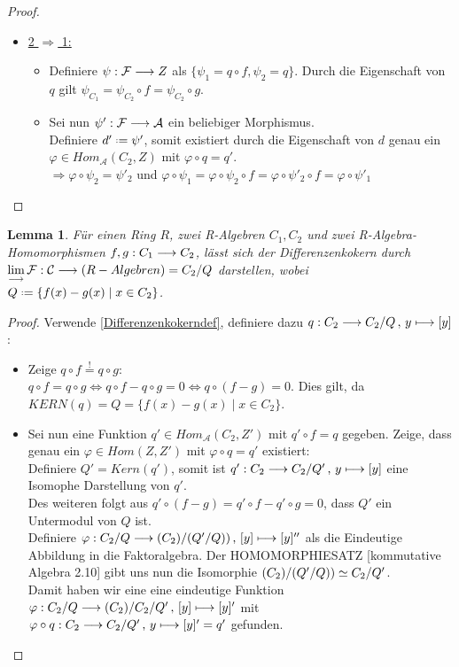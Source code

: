 \documentclass[10pt,a4paper]{report}
\newtheorem{lemma}[satz]{Lemma}
\newcommand{\functionfront}[3]{\nolinebreak{#1:#2 \longrightarrow #3}}
\newcommand{\function}[5]{\nolinebreak{#1:#2 \longrightarrow #3 \, , \, #4 \longmapsto #5}}
\newcommand{\colimes}[0]{\lim\limits_{ \longrightarrow }}
\newcommand*{\defeq}{\mathrel{\vcenter{\baselineskip0.5ex \lineskiplimit0pt
                     \hbox{\scriptsize.}\hbox{\scriptsize.}}}%
                     =}
\newcommand*{\defshow}{\stackrel{!}{=}}
\newcommand{\kernel}[1]{KERN(#1)}
\begin{document}
{\begin{proof}
\begin{itemize}
\item \underline{2 $\Rightarrow$ 1:}
\begin{itemize}
\item[] Definiere $\functionfront{\psi }{\mathcal{F}}{Z}$ als $\lbrace \psi_1 = q \circ f , \psi_2 = q \rbrace$.
Durch die Eigenschaft von $q$ gilt $\psi_{C_1} = \psi_{C_2} \circ f = \psi_{C_2} \circ g$.
\item[] Sei nun $\functionfront{\psi '}{\mathcal{F}}{\mathcal{A}}$ ein beliebiger Morphismus.\\
Definiere $d' \defeq \psi '$, somit existiert durch die Eigenschaft von $d$ genau ein $\varphi \in Hom_{\mathcal{A}}(C_2,Z)$ mit $\varphi \circ q = q'$. \\
$\Rightarrow \varphi \circ \psi_2 = \psi '_2$ 
und $\varphi \circ \psi_1 = \varphi \circ \psi_2 \circ f = \varphi \circ \psi '_2 \circ f = \varphi \circ \psi '_1$
\end{itemize}
\end{itemize}
\end{proof}
\begin{lemma}
Für einen Ring $R$, zwei R-Algebren $C_1,C_2$ und zwei R-Algebra-Homomorphismen $\functionfront{f,g}{C_1}{C_2}$, lässt sich der Differenzenkokern durch\\ $\colimes \functionfront{\mathcal{F}}{\mathcal{C}}{(R-Algebren)} = C_2/Q$ darstellen, wobei $Q \defeq \lbrace f(x) - g(x)\mid x \in C_2 \rbrace$.
\end{lemma}
\begin{proof}
Verwende \cref{Differenzenkokerndef}, definiere dazu $\function{q}{C_2}{C_2/Q}{y}{ [ y ] }$:
\begin{itemize}
\item[] Zeige $q \circ f \defshow q \circ g$:\\
$q \circ f = q \circ g \Leftrightarrow q \circ f - q \circ g = 0 \Leftrightarrow q \circ (f-g) = 0$. Dies gilt, da $\kernel{q} = Q = \lbrace f(x) - g(x)\mid x \in C_2 \rbrace$.
\item[] Sei nun eine Funktion $q' \in Hom_{\mathcal{A}}(C_2,Z')$ mit $q' \circ f = q$ gegeben.
 Zeige, dass genau ein $\varphi \in {Hom(Z,Z')}$  mit $\varphi \circ q = q'$ existiert:\\
Definiere $Q' = Kern(q')$, somit ist $\function{q'}{C_2}{C_2/Q'}{y}{[y]}$ eine Isomophe Darstellung von $q'$.\\
Des weiteren folgt aus $q' \circ (f - g) = q' \circ f - q' \circ g = 0$, dass $Q'$ ein Untermodul von $Q$ ist.\\
Definiere $\function{\varphi}{C_2/Q}{(C_2)/(Q'/Q))}{[y]}{[y]''}$ als die Eindeutige Abbildung in die Faktoralgebra.
Der HOMOMORPHIESATZ [kommutative Algebra 2.10] gibt uns nun die Isomorphie $\nolinebreak{(C_2)/(Q'/Q)) \simeq C_2/Q'}$.\\
Damit haben wir eine eine eindeutige Funktion $\function{\varphi}{C_2/Q}{(C_2)/ C_2/Q'}{[y]}{[y]'}$ mit
 $\function{\varphi \circ q}{C_2}{C_2/Q'}{y}{[y]'} = q'$ gefunden.
\end{itemize}
\end{proof}
}
\end{document}
